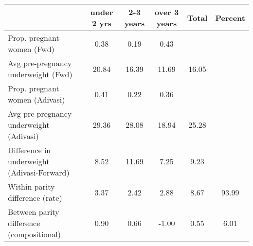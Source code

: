 \begin{tabular}{l*{5}{c}}
\toprule
            &\multicolumn{1}{c}{under 2 yrs}&\multicolumn{1}{c}{2-3 years}&\multicolumn{1}{c}{over 3 years}&\multicolumn{1}{c}{Total}&\multicolumn{1}{c}{Percent}\\
\midrule
\midrule
Prop. pregnant women (Fwd)&        0.38&        0.19&        0.43&            &            \\
Avg pre-pregnancy underweight (Fwd)&       20.84&       16.39&       11.69&       16.05&            \\
Prop. pregnant women (Adivasi)&        0.41&        0.22&        0.36&            &            \\
Avg pre-pregnancy underweight (Adivasi)&       29.36&       28.08&       18.94&       25.28&            \\
Difference in underweight (Adivasi-Forward)&        8.52&       11.69&        7.25&        9.23&            \\
Within parity difference (rate)&        3.37&        2.42&        2.88&        8.67&       93.99\\
Between parity difference (compositional)&        0.90&        0.66&       -1.00&        0.55&        6.01\\
\bottomrule
\end{tabular}

